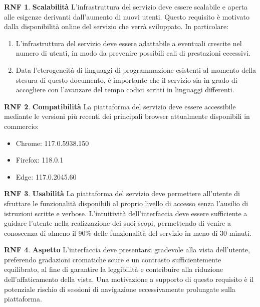 \documentclass[11pt, a4paper]{article}
\theoremstyle{definition}
\newtheorem{nonfuncreq}{RNF} %
\begin{document}
\begin{nonfuncreq}
\label{scalabilita}
\textbf{Scalabilità }
L'infrastruttura del servizio deve essere scalabile e aperta alle esigenze
derivanti dall'aumento di nuovi utenti. Questo requisito è motivato dalla
disponibilità online del servizio che verrà sviluppato. In particolare:
\begin{enumerate}
    \item L'infrastruttura del servizio deve essere adattabile a eventuali
    crescite nel numero di utenti, in modo da prevenire possibili cali di
    prestazioni eccessivi.

    \item Data l'eterogeneità di linguaggi di programmazione esistenti
    al momento della stesura di questo documento, è importante che il
    servizio sia in grado di accogliere con l'avanzare del tempo codici
    scritti in linguaggi differenti.
\end{enumerate}
\end{nonfuncreq}

\begin{nonfuncreq}
\label{compatibility}
\textbf{Compatibilità }
La piattaforma del servizio deve essere accessibile mediante le versioni
più recenti dei principali browser attualmente disponibili in commercio:
\begin{itemize}
    \item Chrome: 117.0.5938.150
    \item Firefox: 118.0.1
    \item Edge: 117.0.2045.60
\end{itemize}
\end{nonfuncreq}


\begin{nonfuncreq}
\textbf{Usabilità }
La piattaforma del servizio deve permettere all'utente di sfruttare le
funzionalità disponibili al proprio livello di accesso senza l'ausilio di
istruzioni scritte e verbose. L'intuitività dell'interfaccia deve essere
sufficiente a guidare l'utente nella realizzazione dei suoi scopi,
permettendo di venire a conoscenza di almeno il 90\% delle funzionalità del
servizio in meno di 30 minuti. 
\end{nonfuncreq}

\begin{nonfuncreq}
\textbf{Aspetto }
L'interfaccia deve presentarsi gradevole alla vista dell'utente, preferendo
gradazioni cromatiche scure e un contrasto sufficientemente equilibrato,
al fine di garantire la leggibilità e contribuire alla riduzione
dell'affaticamento della vista. Una motivazione a supporto di questo requisito
è il potenziale rischio di sessioni di navigazione eccessivamente prolungate sulla piattaforma.
\end{nonfuncreq}
\end{document}
